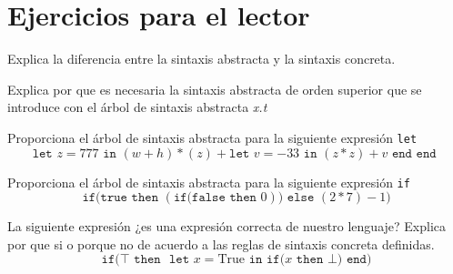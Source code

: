   

    
\section{Ejercicios para el lector}

    \begin{exercise}
        Explica la diferencia entre la sintaxis abstracta y la sintaxis concreta.
    \end{exercise}
\bigskip
    \begin{exercise}
        Explica por que es necesaria la sintaxis abstracta de orden superior que se introduce con el árbol de sintaxis abstracta \textit{x.t}
    \end{exercise}

\bigskip
    \begin{exercise}
        Proporciona el árbol de sintaxis abstracta para la siguiente expresión \texttt{let}
        \[ 
            \texttt{let } z = 777 \texttt{ in } (w + h) * (z) + \texttt{let } v = -33 \texttt{ in } (z * z) + v \texttt{ end } \texttt{end } 
        \]
    \end{exercise}

    \bigskip
    
    \begin{exercise}
        Proporciona el árbol de sintaxis abstracta para la siguiente expresión \texttt{if}
        \[
            \texttt{if(} \texttt{true} \texttt{ then } (\texttt{if(}  \texttt{false} \texttt{ then } 0)) \texttt{ else } (2 * 7) - 1 \texttt{)}
        \]
    \end{exercise}

    \bigskip
    
    \begin{exercise}
        La siguiente expresión ¿es una expresión correcta de nuestro lenguaje? Explica por que si o porque no de acuerdo a las reglas de sintaxis concreta definidas.
        \[
            \texttt{if(} \top \texttt{ then } \texttt{ let } x = \text{True} \texttt{ in} \texttt{ if(} x \texttt{ then } \bot \texttt{)} \texttt{ end} \text{)}
        \]
    \end{exercise}

    \bigskip
    
